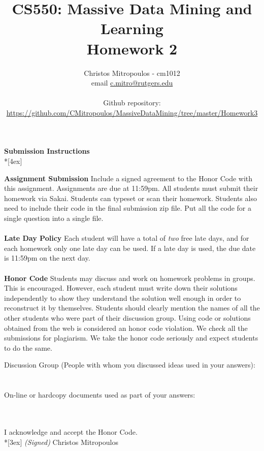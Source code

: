 \documentclass[11pt]{article}
\title{\LARGE{\bf \textsf{CS550: Massive Data Mining and Learning}}\\ {\bf \textsf{Homework 2}}}
\author{Christos Mitropoulos - cm1012 \\ email \href{mailto:c.mitro@rutgers.edu}{c.mitro@rutgers.edu} \\\\ Github repository:\\ \href{https://github.com/CMitropoulos/MassiveDataMining/tree/master/Homework3}{https://github.com/CMitropoulos/MassiveDataMining/tree/master/Homework3}}
\date{}
\begin{document}
\begin{titlepage}
\maketitle
\end{titlepage}

\pagebreak[4]
\begin{center}
\LARGE{\bf \textsf{Submission Instructions}} \\*[4ex]
\end{center}

\textbf{Assignment Submission } Include a signed agreement to the Honor Code with this assignment. Assignments are due at 11:59pm. All students must submit their homework via Sakai. Students can typeset or scan their homework. Students also need to include their code in the final submission zip file. Put all the code for a single question into a single file. 
\\
\\
\textbf{Late Day Policy } Each student will have a total of {\em two} free late days, and for each homework only one late day can be used. If a late day is used, the due date is 11:59pm on the next day.
\\
\\
\textbf{Honor Code } Students may discuss and work on homework problems in groups. This is encouraged. However, each student must write down their solutions independently to show they understand the solution well enough in order to reconstruct it by themselves.  Students should clearly mention the names of all the other students who were part of their discussion group. Using code or solutions obtained from the web is considered an honor code violation. We check all the submissions for plagiarism. We take the honor code seriously and expect students to do the same. 

\vfill
\vfill

Discussion Group (People with whom you discussed ideas used in your answers): \\\\\\
On-line or hardcopy documents used as part of your answers: \\\\\\
\vfill

\vfill

I acknowledge and accept the Honor Code.\\*[3ex]
\bigskip
\textit{(Signed)}
Christos Mitropoulos 
\vfill
\vfill
 
\end{document}
